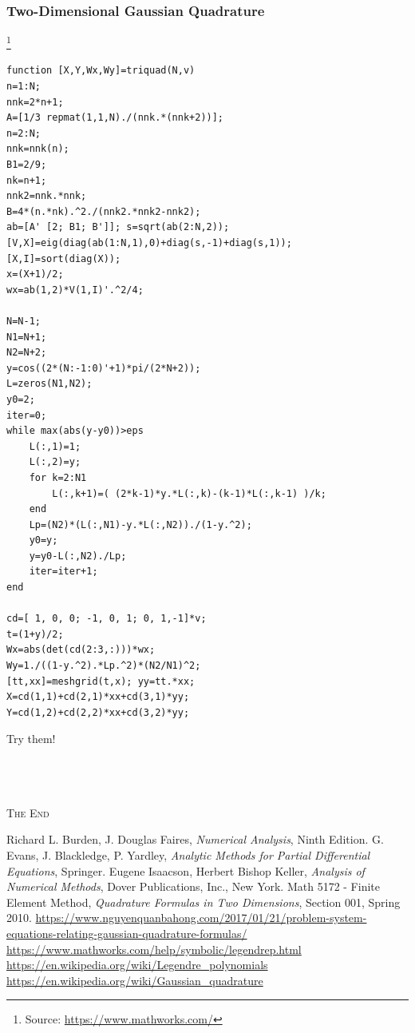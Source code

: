 \documentclass[a4paper]{article}
\numberwithin{equation}{section}
\begin{document}
\subsubsection{Two-Dimensional Gaussian Quadrature}
\footnote{Source: \url{https://www.mathworks.com/}}
\begin{verbatim}
function [X,Y,Wx,Wy]=triquad(N,v)
n=1:N;
nnk=2*n+1;
A=[1/3 repmat(1,1,N)./(nnk.*(nnk+2))];
n=2:N;
nnk=nnk(n);
B1=2/9;
nk=n+1;
nnk2=nnk.*nnk;
B=4*(n.*nk).^2./(nnk2.*nnk2-nnk2);
ab=[A' [2; B1; B']]; s=sqrt(ab(2:N,2));
[V,X]=eig(diag(ab(1:N,1),0)+diag(s,-1)+diag(s,1));
[X,I]=sort(diag(X));
x=(X+1)/2;
wx=ab(1,2)*V(1,I)'.^2/4;

N=N-1;
N1=N+1;
N2=N+2;
y=cos((2*(N:-1:0)'+1)*pi/(2*N+2));
L=zeros(N1,N2);
y0=2;
iter=0;
while max(abs(y-y0))>eps
    L(:,1)=1;
    L(:,2)=y;
    for k=2:N1
        L(:,k+1)=( (2*k-1)*y.*L(:,k)-(k-1)*L(:,k-1) )/k;
    end
    Lp=(N2)*(L(:,N1)-y.*L(:,N2))./(1-y.^2);
    y0=y;
    y=y0-L(:,N2)./Lp;
    iter=iter+1;
end

cd=[ 1, 0, 0; -1, 0, 1; 0, 1,-1]*v;
t=(1+y)/2;
Wx=abs(det(cd(2:3,:)))*wx;
Wy=1./((1-y.^2).*Lp.^2)*(N2/N1)^2;
[tt,xx]=meshgrid(t,x); yy=tt.*xx;
X=cd(1,1)+cd(2,1)*xx+cd(3,1)*yy;
Y=cd(1,2)+cd(2,2)*xx+cd(3,2)*yy;
\end{verbatim}
Try them!\\
\\
\\
\\
\begin{center}
\textsc{The End}
\end{center}
\newpage
\printindex
\newpage
\begin{thebibliography}{999}
 Richard L. Burden, J. Douglas Faires, \textit{Numerical Analysis}, Ninth Edition.
 G. Evans, J. Blackledge, P. Yardley, \textit{Analytic Methods for Partial Differential Equations}, Springer.
 Eugene Isaacson, Herbert Bishop Keller, \textit{Analysis of Numerical Methods}, Dover Publications, Inc., New York.
 Math 5172 - Finite Element Method, \textit{Quadrature Formulas in Two Dimensions}, Section 001, Spring 2010.
 \url{https://www.nguyenquanbahong.com/2017/01/21/problem-system-equations-relating-gaussian-quadrature-formulas/}
 \url{https://www.mathworks.com/help/symbolic/legendrep.html}
 \url{https://en.wikipedia.org/wiki/Legendre_polynomials}
 \url{https://en.wikipedia.org/wiki/Gaussian_quadrature}
\end{thebibliography}
\end{document}

